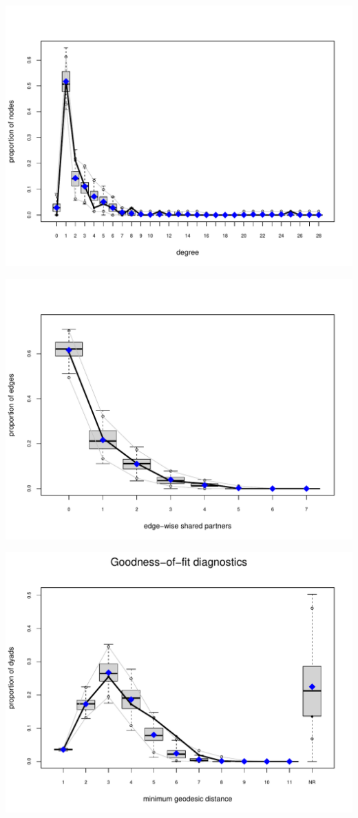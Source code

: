 \documentclass[
]{article}
\begin{document}
\includegraphics{Team4GroupProject_files/figure-pdf/unnamed-chunk-24-2.pdf}

\includegraphics{Team4GroupProject_files/figure-pdf/unnamed-chunk-24-3.pdf}

\includegraphics{Team4GroupProject_files/figure-pdf/unnamed-chunk-24-4.pdf}
\end{document}

